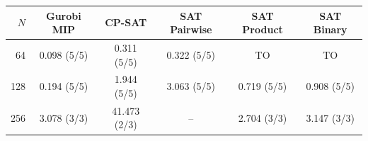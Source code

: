 \begin{tabular}{rccccc}
\toprule
$N$ & Gurobi MIP & CP-SAT & SAT Pairwise & SAT Product & SAT Binary \\
\midrule
64 & 0.098 (5/5) & 0.311 (5/5) & 0.322 (5/5) & TO & TO \\
128 & 0.194 (5/5) & 1.944 (5/5) & 3.063 (5/5) & 0.719 (5/5) & 0.908 (5/5) \\
256 & 3.078 (3/3) & 41.473 (2/3) & -- & 2.704 (3/3) & 3.147 (3/3) \\
\bottomrule
\end{tabular}

